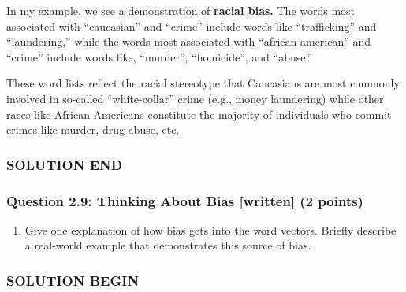 \documentclass[11pt]{article}
\providecommand{\tightlist}{%
      \setlength{\itemsep}{0pt}\setlength{\parskip}{0pt}}
\begin{document}
In my example, we see a demonstration of \textbf{racial bias.} The words
most associated with ``caucasian'' and ``crime'' include words like
``trafficking'' and ``laundering,'' while the words most associated with
``african-american'' and ``crime'' include words like, ``murder'',
``homicide'', and ``abuse.''

These word lists reflect the racial stereotype that Caucasians are most
commonly involved in so-called ``white-collar'' crime (e.g., money
laundering) while other races like African-Americans constitute the
majority of individuals who commit crimes like murder, drug abuse, etc.

\hypertarget{solution-end}{%
\subsubsection{SOLUTION END}\label{solution-end}}

    \hypertarget{question-2.9-thinking-about-bias-written-2-points}{%
\subsubsection{Question 2.9: Thinking About Bias {[}written{]} (2
points)}\label{question-2.9-thinking-about-bias-written-2-points}}

\begin{enumerate}
\def\labelenumi{\alph{enumi}.}
\tightlist
\item
  Give one explanation of how bias gets into the word vectors. Briefly
  describe a real-world example that demonstrates this source of bias.
\end{enumerate}

    \hypertarget{solution-begin}{%
\subsubsection{SOLUTION BEGIN}\label{solution-begin}}
\end{document}
